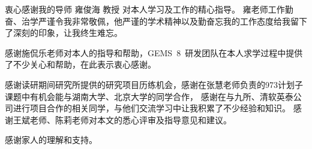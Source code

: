 
\begin{ack}

  衷心感谢我的导师 雍俊海 教授 对本人学习及工作的精心指导。
  雍老师工作勤奋、治学严谨令我非常敬佩，他严谨的学术精神以及勤奋忘我的工作态度给我留下了深刻的印象，让我终生难忘。
  
  感谢施侃乐老师对本人的指导和帮助，GEMS~8~研发团队在本人求学过程中提供了不少关心和帮助，在此表示衷心感谢。
  
  感谢读研期间研究所提供的研究项目历练机会，感谢在张慧老师负责的973计划子课题中有机会能与湖南大学、北京大学的同学合作，
  感谢在与九所、清软英泰公司进行项目合作的相关同学，与他们交流学习中让我积累了不少经验和知识。
  感谢王斌老师、陈莉老师对本文的悉心评审及指导意见和建议。

  感谢家人的理解和支持。

\end{ack}
